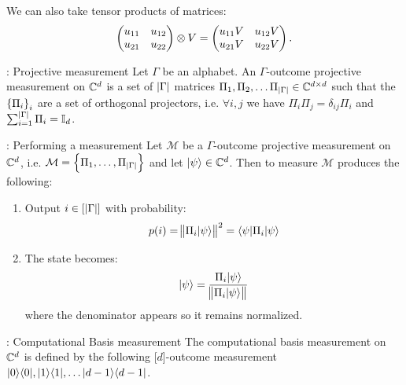 We can also take tensor products of matrices:
\begin{equation}
    \begin{pmatrix}u_{11} & u_{12} \\ u_{21} & u_{22}\end{pmatrix} \otimes V = \begin{pmatrix}u_{11}V & u_{12}V \\ u_{21}V & u_{22}V\end{pmatrix}.
\end{equation}

\begin{defbox}{: Projective measurement}
    Let $\Gamma$ be an alphabet. An $\Gamma$-outcome projective measurement on $\mathbb{C}^d$ is a set of $\lvert \Gamma \rvert$ matrices $\Pi_1, \Pi_2, \ldots \Pi_{\lvert \Gamma \rvert} \in \mathbb{C}^{d \times d}$ such that the $\set{\Pi_i}_i$ are a set of orthogonal projectors, i.e. $\forall i, j$ we have $\Pi_i \Pi_j = \delta_{ij}\Pi_i$ and $\sum_{i=1}^{\lvert \Gamma \rvert} \Pi_i = \mathbb{I}_d$.
\end{defbox}
\begin{defbox}{: Performing a measurement}
    Let $\mathcal{M}$ be a $\Gamma$-outcome projective measurement on $\mathbb{C}^d$, i.e. $\mathcal{M} = \set{\Pi_1, \ldots, \Pi_{\lvert \Gamma \rvert}}$ and let $\lvert \psi \rangle \in \mathbb{C}^d$. Then to measure $\mathcal{M}$ produces the following:
    \begin{enumerate}
        \item Output $i \in [\lvert \Gamma \rvert]$ with probability:
        \begin{equation}
            p(i) = \norm{\Pi_i \lvert \psi \rangle}^2 = \langle \psi \rvert\Pi_i \lvert \psi \rangle
        \end{equation}
        \item The state becomes:
        \begin{equation}
            \lvert \psi \rangle = \frac{\Pi_i \lvert \psi \rangle}{\norm{\Pi_i \lvert \psi \rangle}}
        \end{equation}
        where the denominator appears so it remains normalized.
    \end{enumerate}
\end{defbox}

\begin{defbox}{: Computational Basis measurement}
    The computational basis measurement on $\mathbb{C}^d$ is defined by the following [$d$]-outcome measurement $\lvert 0 \rangle \langle 0 \rvert, \lvert 1 \rangle \langle 1 \rvert, \ldots \lvert d-1 \rangle \langle d-1 \rvert$. 
\end{defbox}

